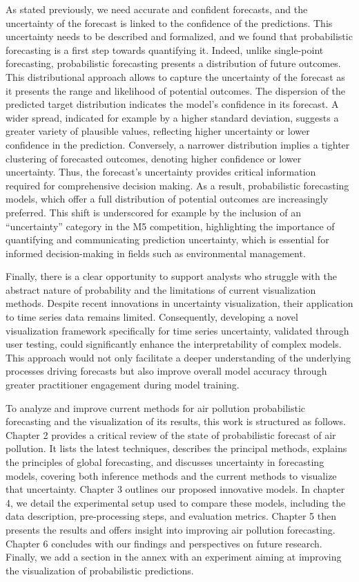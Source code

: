 \documentclass[12pt,a4paper]{book}
\begin{document}
As stated previously, we need accurate and confident forecasts, and the uncertainty of the forecast is linked to the confidence of the predictions. This uncertainty needs to be described and formalized, and we found that probabilistic forecasting is a first step towards quantifying it. Indeed, unlike single-point forecasting, probabilistic forecasting presents a distribution of future outcomes. This distributional approach allows to capture the uncertainty of the forecast as it presents the range and likelihood of potential outcomes. The dispersion of the predicted target distribution indicates the model’s confidence in its forecast. A wider spread, indicated for example by a higher standard deviation, suggests a greater variety of plausible values, reflecting higher uncertainty or lower confidence in the prediction. Conversely, a narrower distribution implies a tighter clustering of forecasted outcomes, denoting higher confidence or lower uncertainty. Thus, the forecast's uncertainty provides critical information required for comprehensive decision making. As a result, probabilistic forecasting models, which offer a full distribution of potential outcomes are increasingly preferred. This shift is underscored for example by the inclusion of an “uncertainty” category in the M5 competition, highlighting the importance of quantifying and communicating prediction uncertainty, which is essential for informed decision-making in fields such as environmental management.

Finally, there is a clear opportunity to support analysts who struggle with the abstract nature of probability and the limitations of current visualization methods. Despite recent innovations in uncertainty visualization, their application to time series data remains limited. Consequently, developing a novel visualization framework specifically for time series uncertainty, validated through user testing, could significantly enhance the interpretability of complex models. This approach would not only facilitate a deeper understanding of the underlying processes driving forecasts but also improve overall model accuracy through greater practitioner engagement during model training.

To analyze and improve current methods for air pollution probabilistic forecasting and the visualization of its results, this work is structured as follows. Chapter 2 provides a critical review of the state of probabilistic forecast of air pollution. It lists the latest techniques, describes the principal methods, explains the principles of global forecasting, and discusses uncertainty in forecasting models, covering both inference methods and the current methods to visualize that uncertainty. Chapter 3 outlines our proposed innovative models. In chapter 4, we detail the experimental setup used to compare these models, including the data description, pre-processing steps, and evaluation metrics. Chapter 5 then presents the results and offers insight into improving air pollution forecasting. Chapter 6 concludes with our findings and perspectives on future research. Finally, we add a section in the annex with an experiment aiming at improving the visualization of probabilistic predictions.
\end{document}
